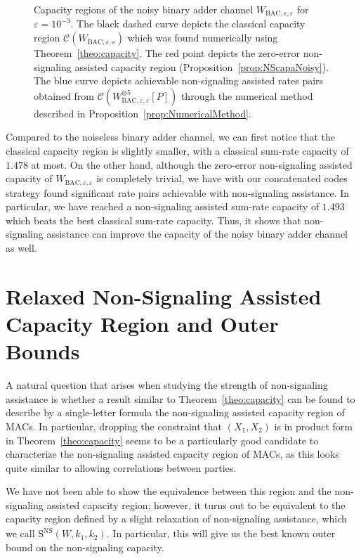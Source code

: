 \begin{figure}[!h]
\begin{center}
      \caption{Capacity regions of the noisy binary adder channel $W_{\text{BAC},\varepsilon,\varepsilon}$ for $\varepsilon = 10^{-3}$. The black dashed curve depicts the classical capacity region $\mathcal{C}(W_{\text{BAC},\varepsilon,\varepsilon})$ which was found numerically using Theorem~\ref{theo:capacity}. The red point depicts the zero-error non-signaling assisted capacity region (Proposition~\ref{prop:NScapaNoisy}). The blue curve depicts achievable non-signaling assisted rates pairs obtained from $\mathcal{C}(W_{\text{BAC},\varepsilon,\varepsilon}^{\otimes 5}[P])$ through the numerical method described in Proposition~\ref{prop:NumericalMethod}.}
      \label{fig:noisyBAC}
    \end{center}
  \end{figure}
\shorthandon{;}
Compared to the noiseless binary adder channel, we can first notice that the classical capacity region is slightly smaller, with a classical  sum-rate capacity of $1.478$ at most. On the other hand, although the zero-error non-signaling assisted capacity of $W_{\text{BAC},\varepsilon,\varepsilon}$ is completely trivial, we have with our concatenated codes strategy found significant rate pairs achievable with non-signaling assistance. In particular, we have reached a non-signaling assisted sum-rate capacity of $1.493$ which beats the best classical sum-rate capacity. Thus, it shows that non-signaling assistance can improve the capacity of the noisy binary adder channel as well.

\section{Relaxed Non-Signaling Assisted Capacity Region and Outer Bounds}
\label{section:OB}
A natural question that arises when studying the strength of non-signaling assistance is whether a result similar to Theorem~\ref{theo:capacity} can be found to describe by a single-letter formula the non-signaling assisted capacity region of MACs. In particular, dropping the constraint that $(X_1,X_2)$ is in product form in Theorem~\ref{theo:capacity} seems to be a particularly good candidate to characterize the non-signaling assisted capacity region of MACs, as this looks quite similar to allowing correlations between parties.

We have not been able to show the equivalence between this region and the non-signaling assisted capacity region; however, it turns out to be equivalent to the capacity region defined by a slight relaxation of non-signaling assistance, which we call $\mathrm{S}^{\overline{\mathrm{NS}}}(W,k_1,k_2)$. In particular, this will give us the best known outer bound on the non-signaling capacity.

